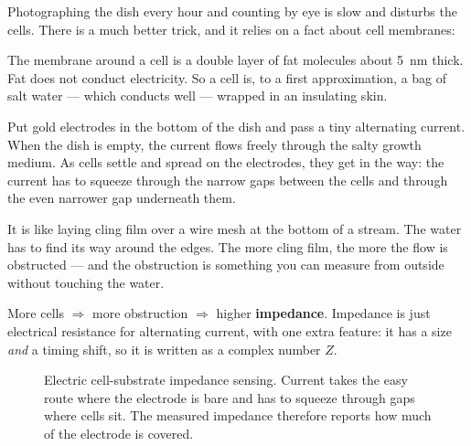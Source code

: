\documentclass[11pt,a4paper]{article}
\begin{document}
Photographing the dish every hour and counting by eye is slow and disturbs the
cells. There is a much better trick, and it relies on a fact about cell
membranes:

\begin{plain}
The membrane around a cell is a double layer of fat molecules about
\SI{5}{\nano\meter} thick. Fat does not conduct electricity. So a cell is, to a
first approximation, a bag of salt water --- which conducts well --- wrapped in
an insulating skin.
\end{plain}

Put gold electrodes in the bottom of the dish and pass a tiny alternating
current. When the dish is empty, the current flows freely through the salty
growth medium. As cells settle and spread on the electrodes, they get in the
way: the current has to squeeze through the narrow gaps between the cells and
through the even narrower gap underneath them.

\begin{analogy}
It is like laying cling film over a wire mesh at the bottom of a stream. The
water has to find its way around the edges. The more cling film, the more the
flow is obstructed --- and the obstruction is something you can measure from
outside without touching the water.
\end{analogy}

More cells $\Rightarrow$ more obstruction $\Rightarrow$ higher \textbf{impedance}.
Impedance is just electrical resistance for alternating current, with one extra
feature: it has a size \emph{and} a timing shift, so it is written as a complex
number $Z$.

\begin{figure}[h]
\centering
{}
\caption{Electric cell-substrate impedance sensing. Current takes the easy route
where the electrode is bare and has to squeeze through gaps where cells sit. The
measured impedance therefore reports how much of the electrode is covered.}
\end{figure}
\end{document}
